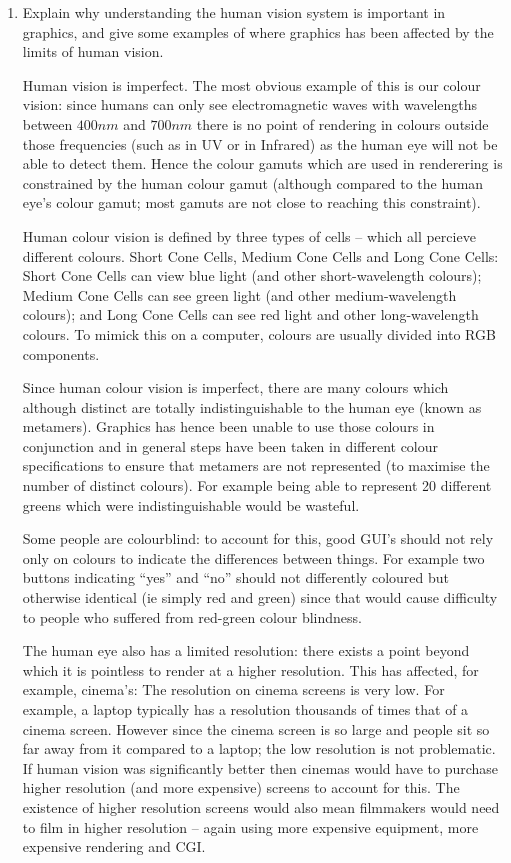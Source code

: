 \documentclass[10pt,\jkfside,a4paper]{article}
\begin{document}
\begin{enumerate}[label=(\alph*)]

\item Explain why understanding the human vision system is important in graphics, 
and give some examples of where graphics has been affected by the limits of human 
vision.

Human vision is imperfect. The most obvious example of this is our colour vision: since 
humans can only see electromagnetic waves with wavelengths between $400nm$ and $700nm$ 
there is no point of rendering in colours outside those frequencies (such as in UV or in 
Infrared) as the human eye will not be able to detect them. Hence the colour gamuts which 
are used in renderering is constrained by the human colour gamut (although compared to 
the human eye's colour gamut; most gamuts are not close to reaching this constraint).

Human colour vision is defined by three types of cells -- which all percieve different 
colours. Short Cone Cells, Medium Cone Cells and Long Cone Cells: Short Cone Cells 
can view blue light (and other short-wavelength colours); Medium Cone Cells can 
see green light (and other medium-wavelength colours); and Long Cone Cells 
can see red light and other long-wavelength colours. 
To mimick this on a computer, colours are usually divided into RGB components.

Since human colour vision is imperfect, there are many colours which although distinct 
are totally indistinguishable to the human eye (known as metamers). Graphics has hence 
been unable to use those colours in conjunction and in general steps have been taken 
in different colour specifications to ensure that metamers are not represented (to maximise 
the number of distinct colours). For example being able to represent 20 different greens 
which were indistinguishable would be wasteful.

Some people are colourblind: to account for this, good GUI's should not rely only on 
colours to indicate the differences between things. For example two buttons indicating 
``yes'' and ``no'' should not differently coloured but otherwise identical (ie simply 
red and green) since that would cause difficulty to people who suffered from red-green 
colour blindness.

The human eye also has a limited resolution: there exists a point beyond which it is 
pointless to render at a higher resolution. This has affected, for example, cinema's: 
The resolution on cinema screens is very low. For example, a laptop typically has a 
resolution thousands of times that of a cinema screen. However since the cinema screen 
is so large and people sit so far away from it compared to a laptop; the low resolution 
is not problematic. If human vision was significantly better then cinemas would have to 
purchase higher resolution (and more expensive) screens to account for this. The 
existence of higher resolution screens would also mean filmmakers would need to film in 
higher resolution -- again using more expensive equipment, more expensive rendering and 
CGI.


\end{enumerate}
\end{document}
